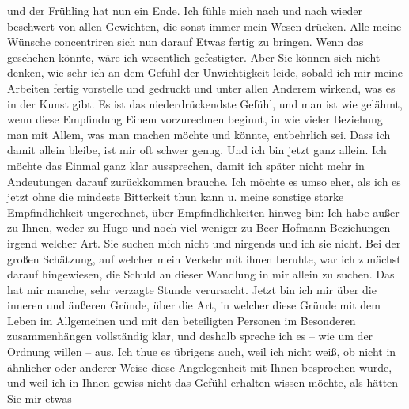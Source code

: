 \begin{ledgroupsized}[t]{13cm}
               und der Frühling hat nun ein Ende. Ich fühle mich nach und nach wieder beschwert von
               allen Gewichten, die sonst immer mein Wesen drücken. Alle meine Wünsche concentriren
               sich nun darauf Etwas fertig zu bringen. Wenn das geschehen könnte, wäre ich
               wesentlich gefestigter. Aber Sie können sich nicht denken, wie sehr ich an dem Gefühl
               der Unwichtigkeit leide, sobald ich mir meine {\pb}Arbeiten fertig vorstelle und
               gedruckt und unter allen Anderem wirkend, was es in der Kunst gibt. Es ist das
               niederdrückendste Gefühl, und man ist wie gelähmt, wenn diese Empfindung Einem
               vorzurechnen beginnt, in wie vieler Beziehung man mit Allem, was man machen möchte
               und könnte, entbehrlich sei. Dass ich damit allein bleibe, ist mir oft schwer genug.
               Und ich bin jetzt ganz allein. Ich möchte das Einmal ganz klar aussprechen, damit ich
               später nicht mehr in Andeutungen darauf zurückkommen brauche. Ich möchte es umso
               eher, als ich es jetzt ohne die mindeste Bitterkeit thun kann u. meine sonstige
               starke Empfindlichkeit ungerechnet, über Empfindlichkeiten hinweg bin: Ich habe außer
               zu Ihnen, weder zu Hugo und noch viel weniger
               zu Beer-Hofmann Beziehungen irgend welcher
               Art. Sie suchen mich nicht und nirgends und ich sie nicht. {\pb}Bei der großen Schätzung, auf
               welcher mein Verkehr mit ihnen beruhte, war ich zunächst darauf hingewiesen, die
               Schuld an dieser Wandlung in mir allein zu suchen. Das hat mir manche, sehr verzagte
               Stunde verursacht. Jetzt bin ich mir über die inneren und äußeren Gründe, über die
               Art, in welcher diese Gründe mit dem Leben im Allgemeinen und mit den \introOben{}beteiligten\introOben{} Personen im Besonderen zusammenhängen vollständig
               klar, und deshalb spreche ich es – wie um der Ordnung willen – aus. Ich thue \introOben{}es\introOben{} übrigens auch, weil ich nicht weiß, ob nicht in ähnlicher
               oder anderer Weise diese Angelegenheit mit Ihnen besprochen wurde, und weil ich in
               Ihnen gewiss nicht das Gefühl erhalten wissen möchte, als hätten Sie mir etwas

\end{ledgroupsized}
